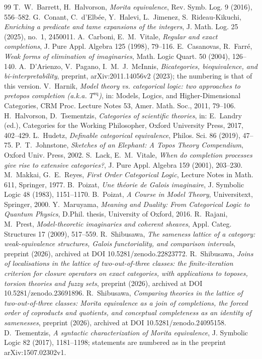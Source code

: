 \documentclass[11pt]{amsart}
\theoremstyle{definition}
\begin{document}
\begin{thebibliography}{99}
 T.~W.~Barrett, H.~Halvorson, \emph{Morita equivalence},
Rev. Symb. Log. 9 (2016), 556--582.
 G.~Conant, C.~d'Elb\'ee, Y.~Halevi, L.~Jimenez,
S.~Rideau-Kikuchi, \emph{Enriching a predicate and tame expansions of
the integers}, J. Math. Log. 25 (2025), no.~1, 2450011.
 A.~Carboni, E.~M.~Vitale, \emph{Regular and exact
completions}, J. Pure Appl. Algebra 125 (1998), 79--116.
 E.~Casanovas, R.~Farr\'e, \emph{Weak forms of elimination
of imaginaries}, Math. Logic Quart. 50 (2004), 126--140.
 A.~D'Arienzo, V.~Pagano, I.~M.~J.~McInnis,
\emph{Bicategories, biequivalence, and bi-interpretability}, preprint,
arXiv:2011.14056v2 (2023); the numbering is that of this version.
 V.~Harnik, \emph{Model theory vs. categorical logic:
two approaches to pretopos completion (a.k.a. $T^{\mathrm{eq}}$)}, in:
Models, Logics, and Higher-Dimensional Categories, CRM Proc. Lecture
Notes 53, Amer. Math. Soc., 2011, 79--106.
 H.~Halvorson, D.~Tsementzis, \emph{Categories of
scientific theories}, in: E.~Landry (ed.), Categories for the Working
Philosopher, Oxford University Press, 2017, 402--429.
 L.~Hudetz, \emph{Definable categorical equivalence},
Philos. Sci. 86 (2019), 47--75.
 P.~T.~Johnstone, \emph{Sketches of an Elephant: A Topos
Theory Compendium}, Oxford Univ. Press, 2002.
 S.~Lack, E.~M.~Vitale, \emph{When do completion processes
give rise to extensive categories?}, J. Pure Appl. Algebra 159 (2001),
203--230.
 M.~Makkai, G.~E.~Reyes, \emph{First Order Categorical
Logic}, Lecture Notes in Math. 611, Springer, 1977.
 B.~Poizat, \emph{Une th\'eorie de Galois imaginaire},
J. Symbolic Logic 48 (1983), 1151--1170.
 B.~Poizat, \emph{A Course in Model Theory},
Universitext, Springer, 2000.
 Y.~Maruyama, \emph{Meaning and Duality: From
Categorical Logic to Quantum Physics}, D.Phil. thesis, University of
Oxford, 2016.
 R.~Rajani, M.~Prest, \emph{Model-theoretic imaginaries
and coherent sheaves}, Appl. Categ. Structures 17 (2009), 517--559.
 R.~Shibusawa, \emph{The sameness lattice of a category:
weak-equivalence structures, Galois functoriality, and comparison intervals},
preprint (2026), archived at DOI 10.5281/zenodo.22823772.
 R.~Shibusawa, \emph{Joins of localisations in the lattice of
two-out-of-three classes: the finite-iteration criterion for closure
operators on exact categories, with applications to toposes, torsion
theories and fuzzy sets}, preprint (2026), archived at DOI
10.5281/zenodo.23691896.
 R.~Shibusawa, \emph{Comparing theories in the lattice
of two-out-of-three classes: Morita equivalence as a join of completions,
the forced order of coproducts and quotients, and conceptual completeness
as an identity of samenesses}, preprint (2026), archived at DOI
10.5281/zenodo.24095158.
 D.~Tsementzis, \emph{A syntactic characterization of
Morita equivalence}, J. Symbolic Logic 82 (2017), 1181--1198; statements
are numbered as in the preprint arXiv:1507.02302v1.
\end{thebibliography}
\end{document}
